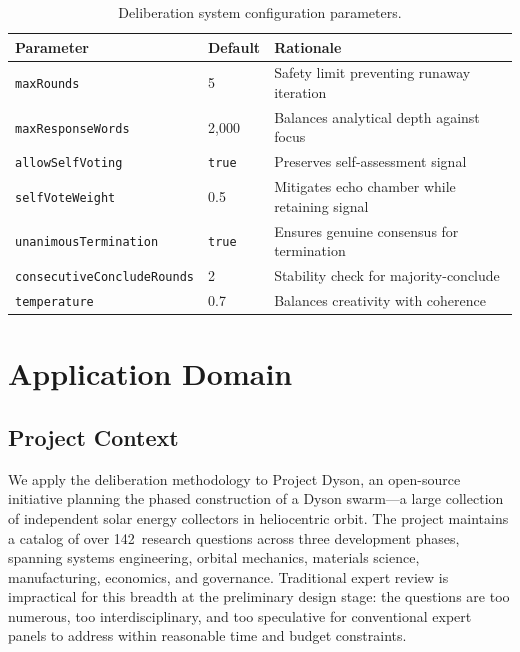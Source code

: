 \documentclass[11pt,a4paper]{article}
\begin{document}
\begin{table}[ht]
\centering
\caption{Deliberation system configuration parameters.}
\label{tab:config}
\begin{tabular}{@{}llp{5.5cm}@{}}
\toprule
\textbf{Parameter} & \textbf{Default} & \textbf{Rationale} \\
\midrule
\texttt{maxRounds} & 5 & Safety limit preventing runaway iteration \\
\texttt{maxResponseWords} & 2{,}000 & Balances analytical depth against focus \\
\texttt{allowSelfVoting} & \texttt{true} & Preserves self-assessment signal \\
\texttt{selfVoteWeight} & 0.5 & Mitigates echo chamber while retaining signal \\
\texttt{unanimousTermination} & \texttt{true} & Ensures genuine consensus for termination \\
\texttt{consecutiveConcludeRounds} & 2 & Stability check for majority-conclude \\
\texttt{temperature} & 0.7 & Balances creativity with coherence \\
\bottomrule
\end{tabular}
\end{table}

\section{Application Domain}
\label{sec:domain}

\subsection{Project Context}

We apply the deliberation methodology to Project Dyson, an open-source initiative planning the phased construction of a Dyson swarm---a large collection of independent solar energy collectors in heliocentric orbit. The project maintains a catalog of over 142~research questions across three development phases, spanning systems engineering, orbital mechanics, materials science, manufacturing, economics, and governance. Traditional expert review is impractical for this breadth at the preliminary design stage: the questions are too numerous, too interdisciplinary, and too speculative for conventional expert panels to address within reasonable time and budget constraints.
\end{document}
